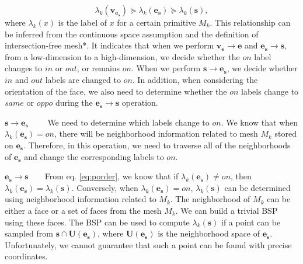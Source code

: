 \begin{equation}
\label{eq:porder}
\lambda_k(\bm{v}_{\bm{e}_{\bm{s}}}) \succeq \lambda_k(\bm{e}_{\bm{s}}) \succeq \lambda_k(\bm{s}),
\end{equation}
where $\lambda_k(x)$ is the label of $x$ for a certain primitive $M_k$. This relationship can be inferred from the continuous space assumption and the definition of intersection-free mesh*. It indicates that when we perform $\bm{v}_{\bm{e}}\to \bm{e}$ and $\bm{e}_{\bm{s}}\to \bm{s}$, from a low-dimension to a high-dimension, we decide whether the $on$ label changes to $in$ or $out$, or remains $on$. When we perform $\bm{s}\to \bm{e}_{\bm{s}}$, we decide whether $in$ and $out$ labels are changed to $on$. In addition, when considering the orientation of the face, we also need to determine whether the $on$ labels change to $same$ or $oppo$ during the $\bm{e}_{\bm{s}}\to \bm{s}$ operation.


\vspace{0.5em}
\noindent\textbf{$\bm{s\to \bm{e}_{\bm{s}}}$}~~~~ We need to determine which labels change to $on$. We know that when $\lambda_k(\bm{e}_{\bm{s}})=on$, there will be neighborhood information related to mesh $M_k$ stored on $\bm{e}_{\bm{s}}$. Therefore, in this operation, we need to traverse all of the neighborhoods of $\bm{e}_{\bm{s}}$ and change the corresponding labels to $on$.



\vspace{0.5em}
\noindent\textbf{$\bm{\bm{e}_{\bm{s}}\to \bm{s}}$}~~~~From eq. \ref{eq:porder}, we know that if $\lambda_k(\bm{e}_{\bm{s}}) \neq on$, then $\lambda_k(\bm{e}_{\bm{s}})=\lambda_k(\bm{s})$. Conversely, when $\lambda_k(\bm{e}_{\bm{s}}) = on$, $\lambda_k(\bm{s})$ can be determined using neighborhood information related to $M_k$. The neighborhood of $M_k$ can be either a face or a set of faces from the mesh $M_k$.  We can build a trivial BSP \cite{thibault1987set} using these faces. The BSP can be used to compute $\lambda_k(\bm{s})$ if a point can be sampled from $\bm{s} \cap \bm{U}(\bm{e}_{\bm{s}})$, where $\bm{U}(\bm{e}_{\bm{s}})$ is the neighborhood space of $\bm{e}_{\bm{s}}$. Unfortunately, we cannot guarantee that such a point can be found with precise coordinates.

